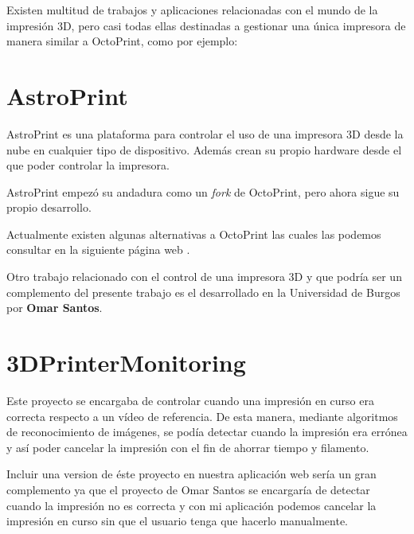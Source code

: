 
Existen multitud de trabajos y aplicaciones relacionadas con el mundo de la impresión 3D, pero casi todas ellas destinadas a gestionar una única impresora de manera similar a OctoPrint, como por ejemplo:

\section{AstroPrint}

AstroPrint \cite{astroprint} es una plataforma para controlar el uso de una impresora 3D desde la nube en cualquier tipo de dispositivo. Además crean su propio hardware desde el que poder controlar la impresora.

AstroPrint empezó su andadura como un \textit{fork} de OctoPrint, pero ahora sigue su propio desarrollo.

Actualmente existen algunas alternativas a OctoPrint las cuales las podemos consultar en la siguiente página web \cite{alternativas}. 

Otro trabajo relacionado con el control de una impresora 3D y que podría ser un complemento del presente trabajo es el desarrollado en la Universidad de Burgos por 
\textbf{Omar Santos}.

\section{3DPrinterMonitoring}

Este proyecto se encargaba de controlar cuando una impresión en curso era correcta respecto a un vídeo de referencia. De esta manera, mediante algoritmos de reconocimiento de imágenes, se podía detectar cuando la impresión era errónea y así poder cancelar la impresión con el fin de ahorrar tiempo y filamento.

Incluir una version de éste proyecto en nuestra aplicación web sería un gran complemento ya que el proyecto de Omar Santos se encargaría de detectar cuando la impresión no es correcta y con mi aplicación podemos cancelar la impresión en curso sin que el usuario tenga que hacerlo manualmente.